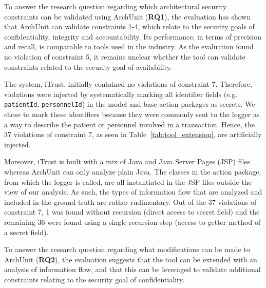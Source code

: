 To answer the research question regarding which architectural security constraints can be validated using ArchUnit (\textbf{RQ1}), the evaluation has shown that ArchUnit can validate constraints 1-4, which relate to the security goals of confidentiality, integrity and accountability. Its performance, in terms of precision and recall, is comparable to tools used in the industry. As the evaluation found no violation of constraint 5, it remains unclear whether the tool can validate constraints related to the security goal of availability.

The system, iTrust, initially contained no violations of constraint 7. Therefore, violations were injected by systematically marking all identifier fields (e.g. \texttt{patientId}, \texttt{personnelId}) in the model and base-action packages as secrets. We chose to mark these identifiers because they were commonly sent to the logger as a way to describe the patient or personnel involved in a transaction. Hence, the 37 violations of constraint 7, as seen in Table~\ref{tab:tool_extension}, are artificially injected.

Moreover, iTrust is built with a mix of Java and Java Server Pages (JSP) files whereas ArchUnit can only analyze plain Java. The classes in the action package, from which the logger is called, are all instantiated in the JSP files outside the view of our analysis. As such, the types of information flow that are analyzed and included in the ground truth are rather rudimentary. Out of the 37 violations of constraint 7, 1 was found without recursion (direct access to secret field) and the remaining 36 were found using a single recursion step (access to getter method of a secret field).

To answer the research question regarding what modifications can be made to ArchUnit (\textbf{RQ2}), the evaluation suggests that the tool can be extended with an analysis of information flow, and that this can be leveraged to validate additional constraints relating to the security goal of confidentiality.




